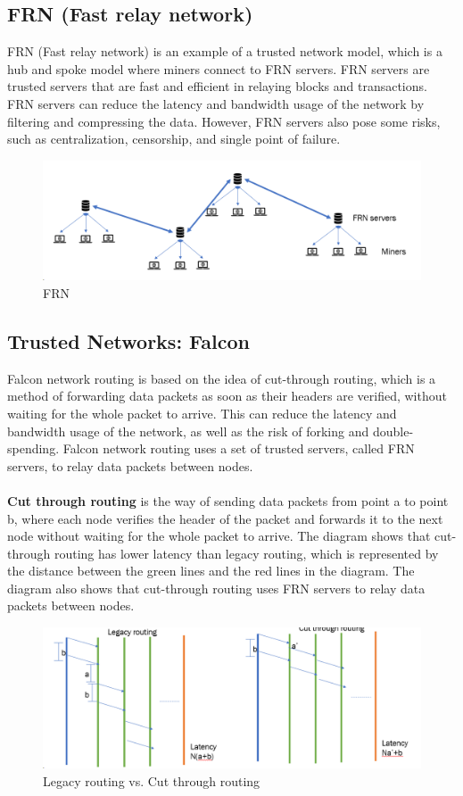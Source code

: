 \subsection{FRN (Fast relay network)}
FRN (Fast relay network) is an example of a trusted network model, which is a hub and spoke model where miners connect to FRN servers. FRN servers are trusted servers that are fast and efficient in relaying blocks and transactions. FRN servers can reduce the latency and bandwidth usage of the network by filtering and compressing the data. However, FRN servers also pose some risks, such as centralization, censorship, and single point of failure.
\begin{figure}[h!]
   \centering
   \includegraphics[width=0.7\linewidth]{Fig/04/F6}
   \caption{FRN}
   \label{fig:f6}
\end{figure}
\subsection{Trusted Networks: Falcon}
Falcon network routing is based on the idea of cut-through routing, which is a method of forwarding data packets as soon as their headers are verified, without waiting for the whole packet to arrive. This can reduce the latency and bandwidth usage of the network, as well as the risk of forking and double-spending. Falcon network routing uses a set of trusted servers, called FRN servers, to relay data packets between nodes.\\\\
\textbf{Cut through routing} is the way of sending data packets from point a to point b, where each node verifies the header of the packet and forwards it to the next node without waiting for the whole packet to arrive. The diagram shows that cut-through routing has lower latency than legacy routing, which is represented by the distance between the green lines and the red lines in the diagram. The diagram also shows that cut-through routing uses FRN servers to relay data packets between nodes.
\begin{figure}[h!]
   \centering
   \includegraphics[width=0.7\linewidth]{Fig/04/F7}
   \caption{Legacy routing vs. Cut through routing}
   \label{fig:f7}
\end{figure}
